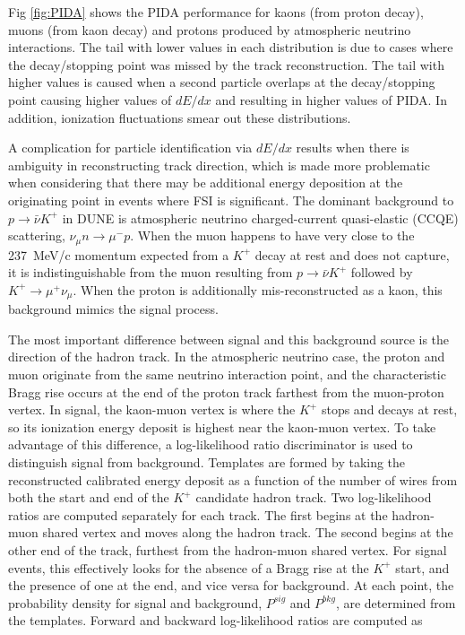 Fig \ref{fig:PIDA} shows the PIDA performance for kaons (from proton decay), muons (from kaon decay) and protons produced by atmospheric neutrino interactions. The tail with lower values in each distribution is due to cases where the decay/stopping point was missed by the track reconstruction. The tail with higher values is caused when a second particle overlaps at the decay/stopping point causing higher values of $dE/dx$ and resulting in higher values of PIDA. In addition, ionization fluctuations smear out these distributions.

A complication for particle identification via $dE/dx$ results when there is ambiguity in reconstructing track direction, which is made more problematic when considering that there may be additional energy deposition at the originating point in events where FSI is significant.  The dominant background to $p\rightarrow \bar{\nu} K^{+}$ in DUNE is atmospheric neutrino charged-current quasi-elastic (CCQE) scattering, $\nu_{\mu} n \rightarrow \mu^{-} p$.  When the muon happens to have very close
to the 237~MeV/c momentum expected from a $K^{+}$ decay at rest and does not capture, it is indistinguishable from the muon resulting from $p\rightarrow \bar{\nu} K^{+}$ followed by $K^{+} \rightarrow \mu^{+}\nu_{\mu}$. When
the proton is additionally mis-reconstructed as a kaon, this background mimics the signal process.  

The most important difference between signal and this background source is the direction of the hadron track. In the atmospheric neutrino case, the proton and muon originate from the same neutrino interaction point, and the characteristic Bragg rise occurs at the end of the proton track farthest from the muon-proton vertex. In signal, the kaon-muon vertex is where the $K^{+}$ stops and decays at rest, so its ionization energy deposit is highest near the kaon-muon vertex.  To take advantage of this difference, a log-likelihood ratio discriminator is used to distinguish signal from background.  Templates are formed by taking the reconstructed calibrated energy deposit as a function of the number of wires from both the start and end of the $K^{+}$ candidate hadron track. 
Two log-likelihood ratios are computed separately for each track. The first begins at the hadron-muon shared vertex and moves along the hadron track. The second begins at the other end of the track, furthest from the hadron-muon shared vertex. For signal events, this effectively looks for the absence of a Bragg rise at the $K^{+}$ start, and the presence of one at the end, and vice versa for background.  At each point, the probability density for signal and background, $P^{sig}$ and $P^{bkg}$, are determined from the templates. Forward and backward log-likelihood ratios are computed as

